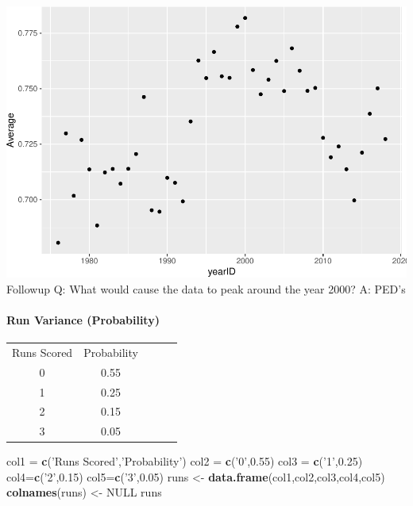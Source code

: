 \documentclass[]{article}
\newenvironment{Shaded}{\begin{snugshade}}{\end{snugshade}}
\newcommand{\FloatTok}[1]{\textcolor[rgb]{0.00,0.00,0.81}{#1}}
\newcommand{\KeywordTok}[1]{\textcolor[rgb]{0.13,0.29,0.53}{\textbf{#1}}}
\newcommand{\NormalTok}[1]{#1}
\newcommand{\OtherTok}[1]{\textcolor[rgb]{0.56,0.35,0.01}{#1}}
\newcommand{\StringTok}[1]{\textcolor[rgb]{0.31,0.60,0.02}{#1}}
\let\oldparagraph\paragraph
\renewcommand{\paragraph}[1]{\oldparagraph{#1}\mbox{}}
\begin{document}
\includegraphics{22-isaac_files/figure-latex/unnamed-chunk-4-1.pdf}
Followup Q: What would cause the data to peak around the year 2000? A:
PED's

\hypertarget{run-variance-probability}{%
\paragraph{Run Variance (Probability)}\label{run-variance-probability}}

\begin{center}
\begin{tabular}{ c c c c c }
 Runs Scored & Probability \\ 
 0 & 0.55 \\  
 1 & 0.25 \\
 2 & 0.15 \\
 3 & 0.05
\end{tabular}
\end{center}

\begin{Shaded}
\begin{Highlighting}[]
\NormalTok{col1 =}\StringTok{ }\KeywordTok{c}\NormalTok{(}\StringTok{'Runs Scored'}\NormalTok{,}\StringTok{'Probability'}\NormalTok{)}
\NormalTok{col2 =}\StringTok{ }\KeywordTok{c}\NormalTok{(}\StringTok{'0'}\NormalTok{,}\FloatTok{0.55}\NormalTok{)}
\NormalTok{col3 =}\StringTok{ }\KeywordTok{c}\NormalTok{(}\StringTok{'1'}\NormalTok{,}\FloatTok{0.25}\NormalTok{)}
\NormalTok{col4=}\KeywordTok{c}\NormalTok{(}\StringTok{'2'}\NormalTok{,}\FloatTok{0.15}\NormalTok{)}
\NormalTok{col5=}\KeywordTok{c}\NormalTok{(}\StringTok{'3'}\NormalTok{,}\FloatTok{0.05}\NormalTok{)}
\NormalTok{runs <-}\StringTok{ }\KeywordTok{data.frame}\NormalTok{(col1,col2,col3,col4,col5)}
\KeywordTok{colnames}\NormalTok{(runs) <-}\StringTok{ }\OtherTok{NULL}
\NormalTok{runs}
\end{Highlighting}
\end{Shaded}
\end{document}
